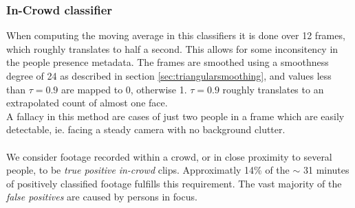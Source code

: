 \subsubsection{In-Crowd classifier}
%
When computing the moving average in this classifiers it is done over 12 frames, which roughly translates to half a second. This allows for some inconsitency in the people presence metadata. The frames are smoothed using a smoothness degree of 24 as described in section \ref{sec:triangularsmoothing}, and values less than $\tau=0.9$ are mapped to 0, otherwise 1. $\tau=0.9$ roughly translates to an extrapolated count of almost one face.\\
%
A fallacy in this method are cases of just two people in a frame which are easily detectable, ie. facing a steady camera with no background clutter.\\
\\
We consider footage recorded within a crowd, or in close proximity to several people, to be \textit{true positive} \textit{in-crowd} clips. Approximatly 14\% of the $\sim$ 31 minutes of positively classified footage fulfills this requirement. The vast majority of the \textit{false positives} are caused by persons in focus.
%
